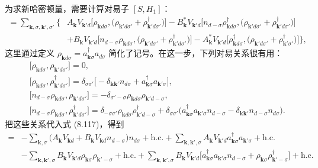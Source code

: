 为求新哈密顿量，需要计算对易子 $[S, H_{1}]$：
\begin{align*}
[S, H_{1}] = \sum_{\mathbf{k},\sigma,\mathbf{k}',\sigma'} \big\{ {} & A_{\mathbf{k}} V_{\mathbf{k}'d} \big[ \rho_{\mathbf{k}d\sigma}, \big( \rho_{\mathbf{k}'d\sigma'} + \rho_{\mathbf{k}'d\sigma'}^{\dagger} \big) \big] - B_{\mathbf{k}}^{*} V_{\mathbf{k}'d} \big[ n_{d-\sigma} \rho_{\mathbf{k}d\sigma}^{\dagger}, \big( \rho_{\mathbf{k}'d\sigma'} + \rho_{\mathbf{k}'d\sigma'}^{\dagger} \big) \big] \\
& + B_{\mathbf{k}} V_{\mathbf{k}'d} \big[ n_{d-\sigma} \rho_{\mathbf{k}d\sigma}, \big( \rho_{\mathbf{k}'d\sigma'} + \rho_{\mathbf{k}'d\sigma'}^{\dagger} \big) \big] - A_{\mathbf{k}}^{*} V_{\mathbf{k}'d} \big[ \rho_{\mathbf{k}d\sigma}^{\dagger}, \big( \rho_{\mathbf{k}'d\sigma'} + \rho_{\mathbf{k}'\sigma'}^{\dagger} \big) \big] \big\}, \tag{8.117}
\end{align*}
这里通过定义 $\rho_{\mathbf{k}d\sigma} = a_{\mathbf{k}\sigma}^{\dagger} a_{d\sigma}$ 简化了记号。在这一步，下列对易关系很有用：
\begin{equation*}
\begin{aligned}
& \big[ \rho_{\mathbf{k}d\sigma}, \rho_{\mathbf{k}'d\sigma'} \big] = 0, \\
& \big[ \rho_{\mathbf{k}d\sigma}, \rho_{\mathbf{k}'d\sigma'}^{\dagger} \big] = \delta_{\sigma\sigma'} \big[ -\delta_{\mathbf{k}\mathbf{k}'} n_{d\sigma} + a_{\mathbf{k}\sigma}^{\dagger} a_{\mathbf{k}'\sigma} \big], \\
& \big[ n_{d-\sigma} \rho_{\mathbf{k}d\sigma}, \rho_{\mathbf{k}'d\sigma'} \big] = -\delta_{\sigma'-\sigma} \rho_{\mathbf{k}d\sigma} \rho_{\mathbf{k}'d-\sigma}, \\
& \big[ n_{d-\sigma} \rho_{\mathbf{k}d\sigma}, \rho_{\mathbf{k}'d\sigma'}^{\dagger} \big] = \delta_{-\sigma\sigma'} \rho_{\mathbf{k}d\sigma} \rho_{\mathbf{k}'d-\sigma}^{\dagger} + \delta_{\sigma\sigma'} \big( a_{\mathbf{k}\sigma}^{\dagger} a_{\mathbf{k}'\sigma} n_{d-\sigma} - \delta_{\mathbf{k}\mathbf{k}'} n_{d-\sigma} n_{d\sigma} \big).
\end{aligned}
\end{equation*}
把这些关系代入式 (8.117)，得到
\begin{align*}
[S, H_{1}] = {} & -\sum_{\mathbf{k},\sigma} \big( A_{\mathbf{k}} V_{\mathbf{k}d} + B_{\mathbf{k}} V_{\mathbf{k}d} n_{d-\sigma} \big) n_{d\sigma} + \mathrm{h.c.} + \sum_{\mathbf{k},\mathbf{k}',\sigma} A_{\mathbf{k}} V_{\mathbf{k}'d} a_{\mathbf{k}\sigma}^{\dagger} a_{\mathbf{k}'\sigma} + \mathrm{h.c.} \\
& -\sum_{\mathbf{k},\mathbf{k}',\sigma} B_{\mathbf{k}} V_{\mathbf{k}'d} \rho_{\mathbf{k}\sigma} \rho_{\mathbf{k}'-\sigma} + \mathrm{h.c.} + \sum_{\mathbf{k},\mathbf{k}',\sigma} B_{\mathbf{k}} V_{\mathbf{k}'d} \big[ a_{\mathbf{k}\sigma}^{\dagger} a_{\mathbf{k}'\sigma} n_{d-\sigma} + \rho_{\mathbf{k}\sigma} \rho_{\mathbf{k}'-\sigma}^{\dagger} \big] + \mathrm{h.c.} \tag{8.118}
\end{align*}

